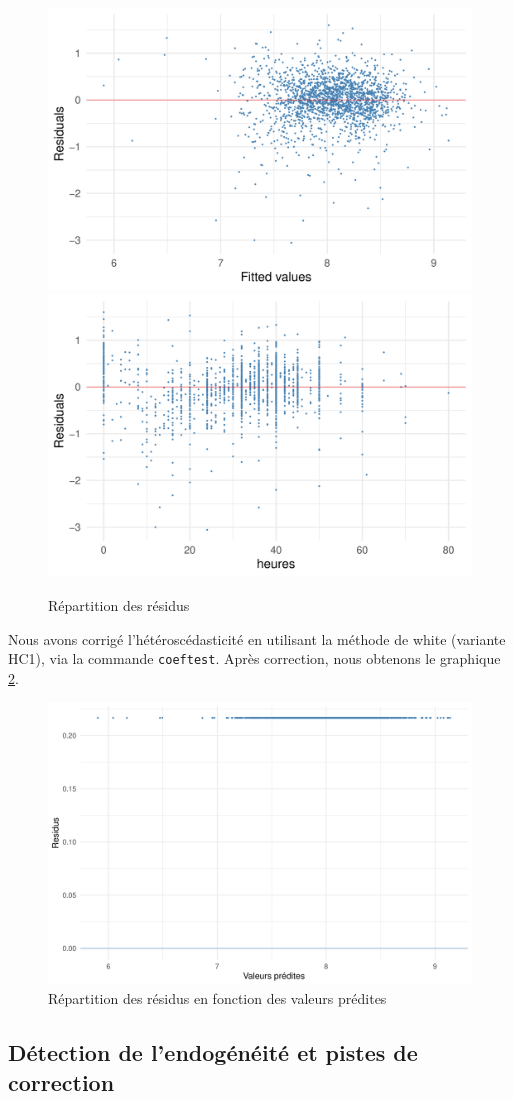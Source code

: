 \documentclass[a4paper, french, 11 pt]{article}\usepackage[]{graphicx}\usepackage[]{xcolor}
\begin{document}
\begin{figure}[h]
\center
\includegraphics[width=0.49\linewidth]{figure/plot_hetero_fitted.pdf}
\includegraphics[width=0.49\linewidth]{figure/plot_hetero_heures.pdf}
\caption{Répartition des résidus\label{fig:hetero}}
\end{figure}



Nous avons corrigé l'hétéroscédasticité en utilisant la méthode de white (variante HC1), via la commande \verb+coeftest+. Après correction, nous obtenons le graphique \ref{fig:hetero_correct}.

\begin{figure}[h]
\center
\includegraphics[width=0.7\linewidth]{figure/hetero_correct.pdf}
\caption{Répartition des résidus en fonction des valeurs prédites\label{fig:hetero_correct}}
\end{figure}



\subsection{Détection de l’endogénéité et pistes de correction}
\end{document}
